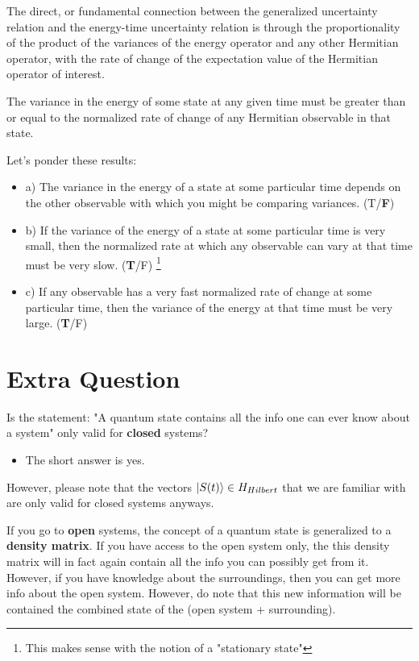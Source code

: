 \documentclass{article}
\begin{document}
The direct, or fundamental connection between the generalized uncertainty relation and the energy-time uncertainty relation is through the proportionality of the product of the variances of the energy operator and any other Hermitian operator, with the rate of change of the expectation value of the Hermitian operator of interest. 

The variance in the energy of some state at any given time must be greater than or equal to the normalized rate of change of any Hermitian observable in that state.  

Let's ponder these results:

\begin{itemize}
    \item a) The variance in the energy of a state at some particular time depends on the other observable with which you might be comparing variances. (T/\textbf{F})
    \item b) If the variance of the energy of a state at some particular time is very small, then the normalized rate at which any observable can vary at that time must be very slow.  (\textbf{T}/F) \footnote{This makes sense with the notion of a "stationary state"}
    \item c) If any observable has a very fast normalized rate of change at some particular time, then the variance of the energy at that time must be very large. (\textbf{T}/F)

\end{itemize}





\section{Extra Question}

Is the statement: "A quantum state contains all the info one can ever know about a system" only valid for \textbf{closed} systems?

\begin{itemize}
    \item The short answer is yes. 
\end{itemize}

However, please note that the vectors $\ket{S(t)} \in H_{Hilbert}$ that we are familiar with are only valid for closed systems anyways. 

If you go to \textbf{open} systems, the concept of a quantum state is generalized to a \textbf{density matrix}. If you have access to the open system only, the this density matrix will in fact again contain all the info you can possibly get from it. However, if you have knowledge about the surroundings, then you can get more info about the open system. However, do note that this new information will be contained the combined state of the (open system + surrounding). 

\end{document}

